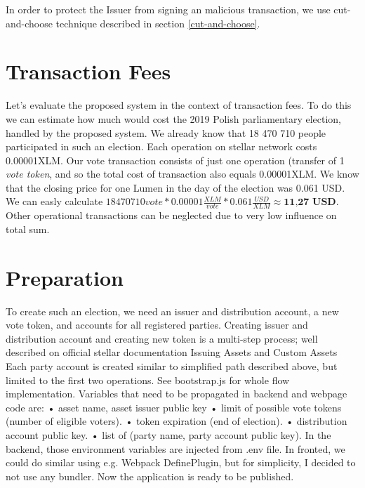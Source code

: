 \documentclass[runningheads]{llncs}
\begin{document}
In order to protect the Issuer from signing an malicious transaction, we use cut-and-choose technique described in section \ref{cut-and-choose}.


\section{Transaction Fees}
Let’s evaluate the proposed system in the context of transaction fees. To do this we can estimate how much would cost the 2019 Polish parliamentary election, handled by the proposed system. We already know that 18 470 710 people participated in such an election. Each operation on stellar network costs 0.00001XLM. Our vote transaction consists of just one operation (transfer of 1 \textit{vote token}, and so the total cost of transaction also equals 0.00001XLM. We know that the closing price for one Lumen in the day of the election was 0.061 USD. We can easly calculate \(18470710 vote * 0.00001 \frac{XLM}{vote} * 0.061 \frac{USD}{XLM} \approx \textbf{11,27 USD}\). Other operational transactions can be neglected due to very low influence on total sum.

\section{Preparation}
To create such an election, we need an issuer and distribution account, a new vote token, and accounts for all registered parties. Creating issuer and distribution account and creating new token is a multi-step process; well described on official stellar documentation Issuing Assets and Custom Assets Each party account is created similar to simplified path described above, but limited to the first two operations. See bootstrap.js for whole flow implementation. Variables that need to be propagated in backend and webpage code are:
• asset name, asset issuer public key
• limit of possible vote tokens (number of eligible voters). • token expiration (end of election).
• distribution account public key.
• list of (party name, party account public key).
In the backend, those environment variables are injected from .env file. In fronted, we could do similar using e.g. Webpack DefinePlugin, but for simplicity, I decided to not use any bundler.
Now the application is ready to be published.
\end{document}
